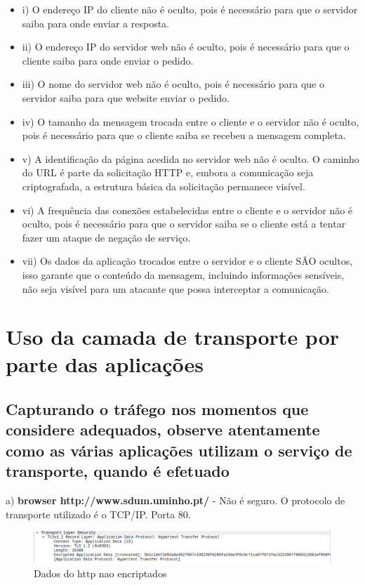 \documentclass{article}
\begin{document}
\begin{itemize}
    \item i) O endereço IP do cliente não é oculto, pois é necessário para que o servidor saiba para onde enviar a resposta.
    \item ii) O endereço IP do servidor web não é oculto, pois é necessário para que o cliente saiba para onde enviar o pedido.
    \item iii) O nome do servidor web não é oculto, pois é necessário para que o servidor saiba para que website enviar o pedido.
    \item iv) O tamanho da mensagem trocada entre o cliente e o servidor não é oculto, pois é necessário para que o cliente saiba se recebeu a mensagem completa.
    \item v) A identificação da página acedida no servidor web não é oculto. O caminho do URL é parte da solicitação HTTP e, embora a comunicação seja criptografada, a estrutura básica da solicitação permanece visível.
    \item vi) A frequência das conexões estabelecidas entre o cliente e o servidor não é oculto, pois é necessário para que o servidor saiba se o cliente está a tentar fazer um ataque de negação de serviço.
    \item vii) Os dados da aplicação trocados entre o servidor e o cliente SÃO ocultos, isso garante que o conteúdo da mensagem, incluindo informações sensíveis, não seja visível para um atacante que possa interceptar a comunicação. 
\end{itemize}



\section{Uso da camada de transporte por parte das aplicações}

\subsection{Capturando o tráfego nos momentos que considere adequados, observe atentamente como as várias aplicações
utilizam o serviço de transporte, quando é efetuado}

a) \textbf{browser http://www.sdum.uminho.pt/} - Não é seguro. O protocolo de transporte utilizado é o TCP/IP. Porta 80.

\begin{figure}[h!]
    \centering
    \includegraphics[width=1\textwidth]{images/httpsdata.png}
    \caption{Dados do http nao encriptados}
    \label{fig:enter-label}
\end{figure}
\end{document}
